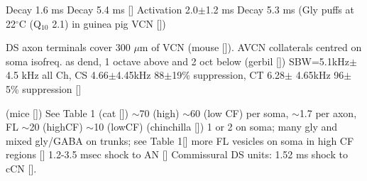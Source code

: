 
Decay 1.6 ms 
Decay 5.4 ms []    
Activation 2.0$\pm$1.2 ms Decay 5.3 ms (Gly puffs at 22$^\circ$C (Q$_{10}$ 2.1) in  guinea pig VCN [])

DS axon terminals cover 300 $\mu$m of VCN (mouse []).
AVCN collaterals centred on soma isofreq. as dend, 1 octave above and 2 oct below (gerbil []) 
SBW=5.1kHz$\pm$4.5 kHz all Ch, CS 4.66$\pm$4.45kHz 88$\pm$19\% suppression, CT 6.28$\pm$ 4.65kHz    96$\pm$5\% suppression []

(mice []) 
See Table 1 (cat []) 
$\sim$70 (high) $\sim$60 (low CF) per soma, 
$\sim$1.7 per axon, FL $\sim$20 (highCF)
$\sim$10 (lowCF) (chinchilla [])                
1 or 2 on soma; many gly and mixed gly/GABA on trunks; see Table 1[] 
more FL vesicles on soma in high CF regions []      
1.2-3.5 msec shock to AN []
Commissural DS units: 1.52 ms shock to cCN [].




